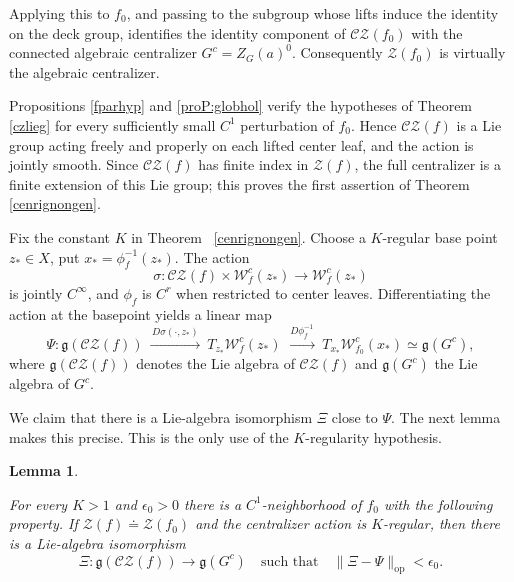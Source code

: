 \documentclass[11pt]{amsart}
\numberwithin{equation}{section}
\newcommand{\CZ}{\mathcal{CZ}}
\theoremstyle{plain}
\newtheorem{lem}[thm]{Lemma}
\begin{document}
Applying this to $f_0$, and passing to the subgroup whose lifts induce the
identity on the deck group, identifies the identity component of
$\CZ(f_0)$ with the connected algebraic centralizer $G^c=Z_G(a)^0$.
Consequently $\mathcal Z(f_0)$ is  virtually the  algebraic centralizer.



 Propositions \ref{fparhyp} and \ref{proP:globhol} verify
the hypotheses of Theorem \ref{czlieg} for  every sufficiently small
$C^1$  perturbation of $f_0$.  Hence $\CZ(f)$ is a Lie group acting freely and
properly on  each lifted center leaf, and the action is jointly smooth.
 Since $\CZ(f)$ has finite index in $\mathcal Z(f)$, the  full centralizer is
a finite  extension of  this Lie group; this proves the first assertion of
Theorem \ref{cenrignongen}.



 Fix the constant $K$ in Theorem ~\ref{cenrignongen}.   Choose a
$K$-regular  base point $z_\ast\in X$, put
$x_\ast=\phi_f^{-1}(z_\ast)$.  The action
 \[
\sigma:\CZ(f)\times \mathcal W^c_f(z_\ast)
       \longrightarrow\mathcal W^c_f(z_\ast)
\]
is jointly $C^\infty$, and  $\phi_f$ is $C^r$ when restricted to center
leaves. Differentiating the action at the basepoint yields a linear map
 \begin{equation}\label{equ:Psi}
\Psi:\mathfrak g(\CZ(f))
\ \xrightarrow{\,D\sigma(\cdot,z_\ast)\,}\ 
T_{z_\ast}\mathcal W^c_f(z_\ast)
\ \xrightarrow{\,D\phi_f^{-1}\,}\ 
T_{x_\ast}\mathcal W^c_{f_0}(x_\ast)\simeq\mathfrak g(G^c),
\end{equation}
where $\mathfrak g(\CZ(f))$ denotes the Lie algebra of $\CZ(f)$ and
$\mathfrak g(G^c)$ the Lie algebra of $G^c$.

We claim that there  is a  Lie-algebra isomorphism $\Xi$  close to $\Psi$.
The  next lemma makes this precise.   This is the  only use of the
 $K$-regularity hypothesis.


\begin{lem}\label{liealg}

For  every $K>1$ and  $\epsilon_0>0$ there  is a $C^1$-neighborhood of
$f_0$ with the following  property.  If
 $\mathcal Z(f)\doteq\mathcal Z(f_0)$ and the  centralizer action is
$K$-regular, then  there is a  Lie-algebra isomorphism
 \[
 \Xi:\mathfrak g(\CZ(f))\longrightarrow\mathfrak g(G^c)
 \quad\text{such that}\quad
 \|\Xi-\Psi\|_{\mathrm{op}}<\epsilon_0.
\]

\end{lem}
\end{document}
